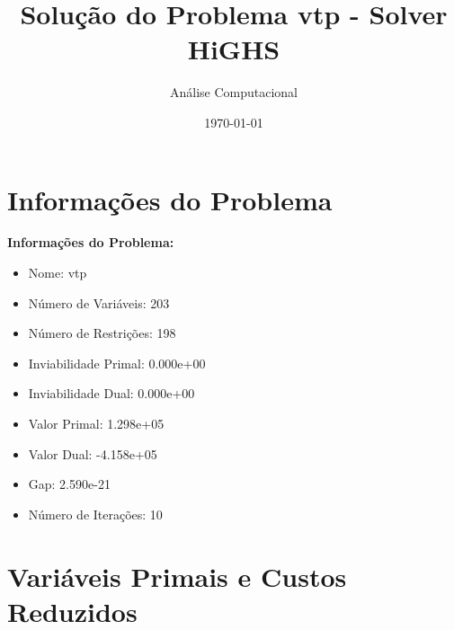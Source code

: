 \documentclass[12pt]{article}
\title{Solução do Problema vtp - Solver HiGHS}
\author{Análise Computacional}
\date{\today}
\begin{document}
\maketitle

\section{Informações do Problema}

\textbf{Informações do Problema:}
\begin{itemize}
\item Nome: vtp
\item Número de Variáveis: 203
\item Número de Restrições: 198
\item Inviabilidade Primal: 0.000e+00
\item Inviabilidade Dual: 0.000e+00
\item Valor Primal: 1.298e+05
\item Valor Dual: -4.158e+05
\item Gap: 2.590e-21
\item Número de Iterações: 10
\end{itemize}


\section{Variáveis Primais e Custos Reduzidos}
\end{document}
